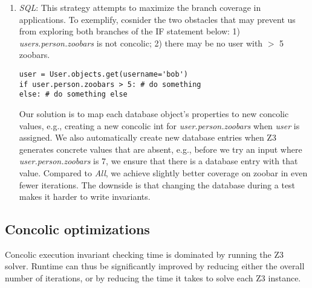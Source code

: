 \documentclass{article}
\begin{document}
\begin{enumerate}
\item \textit{SQL}:
  This strategy attempts to maximize the branch coverage in applications. To
  exemplify, cosnider the two obstacles that may prevent us from exploring both
  branches of the IF statement below:
  1) \textit{users.person.zoobars} is not
  concolic; 2) there may be no user with $>$ 5 zoobars.
  \begin{verbatim}user = User.objects.get(username='bob')
if user.person.zoobars > 5: # do something
else: # do something else\end{verbatim}
  Our solution is to map each database object's properties to new concolic
  values, e.g., creating a new concolic int for
  \textit{user.person.zoobars} when \textit{user} is assigned. We also
  automatically create new database entries when Z3 generates
  concrete values that are absent, e.g., before we try an input where
  \textit{user.person.zoobars} is 7, we ensure that there is a
  database entry with that value. Compared to \textit{All}, we
  achieve slightly better coverage on zoobar in even fewer iterations.
  The downside is that changing the database during a test makes it harder to
  write invariants.
\end{enumerate}

\subsection{Concolic optimizations}

Concolic execution invariant checking time is dominated by running the Z3
solver. Runtime can thus be significantly improved by reducing either the
overall number of iterations, or by reducing the time it takes to solve each Z3
instance.
\end{document}
